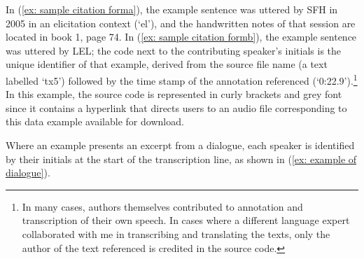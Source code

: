     \label{ex: sample citation forma}
        \label{ex: sample citation formb}
    \z
\z

In (\ref{ex: sample citation forma}), the example sentence was uttered by SFH in 2005 in an elicitation context (`el'), and the handwritten notes of that session are located in book 1, page 74. In (\ref{ex: sample citation formb}), the example sentence was uttered by LEL; the code next to the contributing speaker's initials is the unique identifier of that example, derived from the source file name (a text labelled `tx5') followed by the time stamp of the annotation referenced (`0:22.9’).\footnote{In many cases, authors themselves contributed to annotation and transcription of their own speech. In cases where a different language expert collaborated with me in transcribing and translating the texts, only the author of the text referenced is credited in the source code.} In this example, the source code is represented in curly brackets and grey font since it contains a hyperlink that directs users to an audio file corresponding to this data example available for download.


Where an example presents an excerpt from a dialogue, each speaker is identified by their initials at the start of the transcription line, as shown in (\ref{ex: example of dialogue}).

\largerpage

